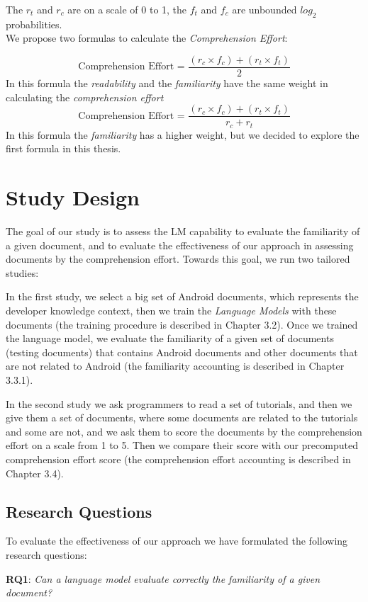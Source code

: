 \documentclass[12pt,mscthesis]{usiinfthesis}
\begin{document}
 The $r_{t}$  and $r_{c}$ are on a scale of 0 to 1,  the $f_{t}$  and $f_{c}$ are unbounded $log_{2}$ probabilities.\\
 We propose two formulas to calculate the \emph{Comprehension Effort}:

 \[\text{Comprehension Effort = }\frac{(r_{c}\times f_{c}) + (r_{t} \times f_{t})}{2} \]
 In this formula the \emph{readability} and the \emph{familiarity} have the same weight in calculating the \emph{comprehension effort}
 \[\text{Comprehension Effort = }\frac{(r_{c}\times f_{c}) + (r_{t} \times f_{t})}{r_c+r_t} \]
 In this formula the \emph{familiarity} has a higher weight, but we decided to explore the first formula in this thesis.
	
\chapter{Study Design}

	The goal of our study is to assess the LM capability to evaluate the familiarity of a given document, and to evaluate the effectiveness of our approach in assessing documents by the comprehension effort. Towards this goal, we run two tailored studies:
	

	In the first study, we select a big set of Android documents, which represents the developer knowledge context, then we train the \emph{Language Models} with these documents (the training procedure is described in Chapter 3.2). Once we trained the language model, we evaluate the familiarity of a given set of documents (testing documents) that contains Android documents and other documents that are not related to Android (the familiarity accounting is described in Chapter 3.3.1). 
		

	 In the second study we ask programmers to read a set of tutorials, and then we give them a set of documents, where some documents are related to the tutorials and some are not, and we ask them to score the documents by the comprehension effort on a scale from 1 to 5. Then we compare their score with our precomputed comprehension effort score (the comprehension effort accounting is described in Chapter 3.4).


	\section{Research Questions}
	To evaluate the effectiveness of our approach we have formulated the following research questions:
	\newpage

	 \textbf{RQ1}: \emph{Can a language model evaluate correctly the familiarity of a given document?}
\end{document}
